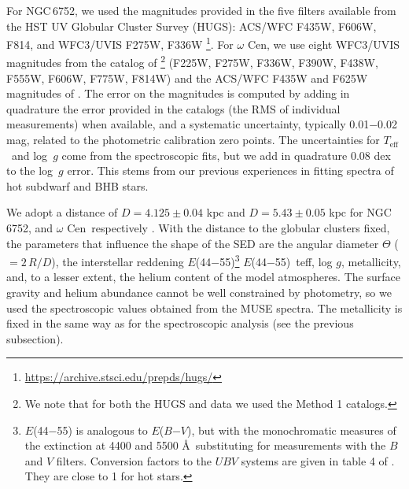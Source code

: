\documentclass{aa}
\newcommand{\teff}{$T_{\text{eff}}$}
\newcommand{\Cen}{$\omega$ Cen}
\newcommand{\ngc}{NGC\,6752}
\begin{document}
For \ngc, we used the magnitudes provided in the five filters available from the HST UV Globular Cluster Survey (HUGS): ACS/WFC F435W, F606W, F814, and WFC3/UVIS F275W, F336W \citep{piotto2015,nardiello2018}\footnote{\url{https://archive.stsci.edu/prepds/hugs/}}.  
For \Cen, we use eight WFC3/UVIS magnitudes from the catalog of \citet{bellini2017a}\footnote{We note that for both the HUGS and \citet{bellini2017a} data we used the Method 1 catalogs.} (F225W, F275W, F336W, F390W, F438W, F555W, F606W, F775W, F814W) and the ACS/WFC F435W and F625W magnitudes of \citet{anderson10}.
The error on the magnitudes is computed by adding in quadrature the error provided in the catalogs (the RMS of individual measurements) when available, and a systematic uncertainty, typically 0.01$-$0.02 mag, related to the photometric calibration zero points. The uncertainties for \teff\ and log~$g$ come from the spectroscopic fits, but we add in quadrature 0.08 dex to the log~$g$ error. This stems from our previous experiences in fitting spectra of hot subdwarf and BHB stars. 


We adopt a distance of $D=4.125 \pm 0.04$ kpc 
and $D= 5.43 \pm 0.05$ kpc 
for \ngc, and \Cen\ respectively \citep{Baumgardt2021}.
With the distance to the globular clusters fixed, the parameters that influence the shape of the SED are the angular diameter $\Theta$ ($=2\,R/D$), the interstellar reddening $E$(44$-$55)\footnote{$E$(44$-$55) is analogous to $E$($B$$-$$V$), but with the monochromatic measures of the extinction at 4400 and
5500 \AA\ substituting for measurements with the $B$ and $V$ filters. 
Conversion factors to the $UBV$ systems are given in table 4 of \citet{2019ApJ...886..108F}. They are close to 1 for hot stars.}
$E$(44$-$55)\, teff, log $g$, metallicity, and, to a lesser extent, the helium content of the model atmospheres.
The surface gravity and helium abundance cannot be well constrained by photometry, so we used the spectroscopic values obtained from the MUSE spectra. The metallicity is fixed in the same way as for the spectroscopic analysis (see the previous subsection). 
\end{document}
